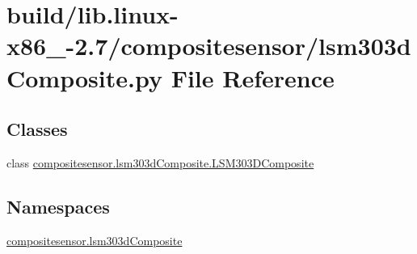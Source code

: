 \hypertarget{build_2lib_8linux-x86__64-2_87_2compositesensor_2lsm303dComposite_8py}{}\section{build/lib.linux-\/x86\+\_-\/2.7/compositesensor/lsm303d\+Composite.py File Reference}
\label{build_2lib_8linux-x86__64-2_87_2compositesensor_2lsm303dComposite_8py}
\subsection*{Classes}
\begin{DoxyCompactItemize}
\item 
class \hyperlink{classcompositesensor_1_1lsm303dComposite_1_1LSM303DComposite}{compositesensor.\+lsm303d\+Composite.\+L\+S\+M303\+D\+Composite}
\end{DoxyCompactItemize}
\subsection*{Namespaces}
\begin{DoxyCompactItemize}
\item 
 \hyperlink{namespacecompositesensor_1_1lsm303dComposite}{compositesensor.\+lsm303d\+Composite}
\end{DoxyCompactItemize}
